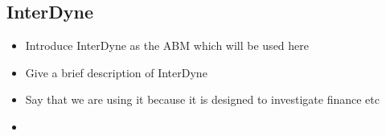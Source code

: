 \documentclass{article}
\begin{document}
%



\subsection{InterDyne} \label{InterDyne_section}
\begin{itemize}
  \item Introduce InterDyne as the ABM which will be used here 
  \item Give a brief description of InterDyne 
  \item Say that we are using it because it is designed to investigate finance etc
  \item
\end{itemize}



\end{document}
